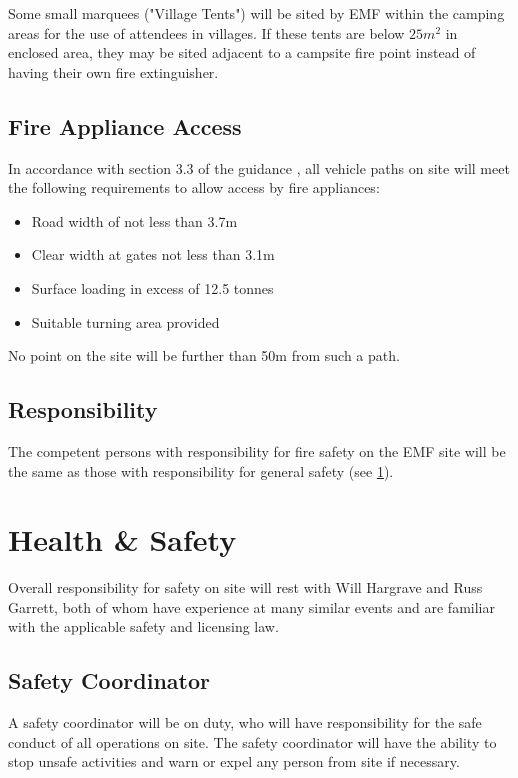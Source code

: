 Some small marquees ("Village Tents") will be sited by EMF within the camping areas for the use of
attendees in villages. If these tents are below $25m^2$ in enclosed area, they may be sited adjacent
to a campsite fire point instead of having their own fire extinguisher.

\subsection{Fire Appliance Access}
In accordance with section 3.3 of the guidance \cite{firesafety}, all vehicle paths on site
will meet the following requirements to allow access by fire appliances:

\begin{itemize}
\tightlist
\item Road width of not less than 3.7m
\item Clear width at gates not less than 3.1m
\item Surface loading in excess of 12.5 tonnes
\item Suitable turning area provided
\end{itemize}

No point on the site will be further than 50m from such a path.

\subsection{Responsibility}
The competent persons with responsibility for fire safety on the EMF site will be the same
as those with responsibility for general safety (see \cref{safety}).

\newpage

\section{Health \& Safety}\label{safety}

Overall responsibility for safety on site will rest with Will Hargrave and
Russ Garrett, both of whom have experience at many similar events and are
familiar with the applicable safety and licensing law.

\subsection{Safety Coordinator}

A safety coordinator will be on duty, who will have responsibility for the
safe conduct of all operations on site. The safety coordinator will have the
ability to stop unsafe activities and warn or expel any person from site if
necessary.

